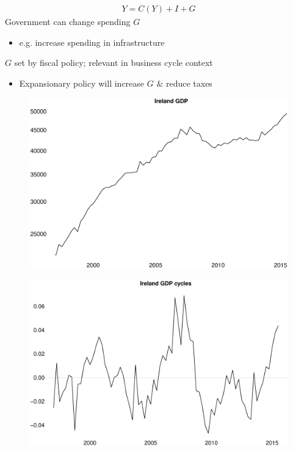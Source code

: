 \documentclass{beamer}
\begin{document}
\begin{frame}
  \begin{align*}
    Y=C(Y) + I + G
  \end{align*}
  \medskip
  Government can change spending $G$
  \begin{itemize}
    \item e.g. increase spending in infrastructure
  \end{itemize}
  \medskip
  $G$ set by fiscal policy; relevant in business cycle context
  \begin{itemize}
    \item Expansionary policy will increase $G$ \& reduce taxes
  \end{itemize}
\end{frame}

\begin{frame}
  \begin{figure}
    \includegraphics[scale=.25]{ire_gdp.eps}
  \end{figure}
\end{frame}

\begin{frame}
  \begin{figure}
    \includegraphics[scale=.25]{ire_gdp_hp.eps}
  \end{figure}
\end{frame}
\end{document}

